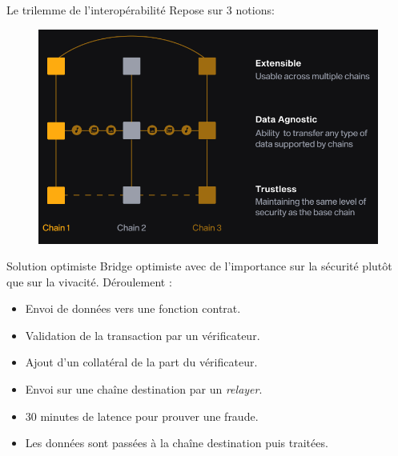 \begin{frame}{Le trilemme de l’interopérabilité}
    Repose sur 3 notions: 
    \begin{figure}
        \centering
        \includegraphics[scale = 0.7]{img/3notions.png}
    \end{figure}
    \end{frame}

\begin{frame}{Solution optimiste}
Bridge optimiste avec de l'importance sur la sécurité plutôt que sur la vivacité.
Déroulement : \newline
\begin{itemize}
    \item Envoi de données vers une fonction contrat.
    \item Validation de la transaction par un vérificateur. 
    \item Ajout d'un collatéral de la part du vérificateur. 
    \item Envoi sur une chaîne destination par un \textit{relayer}. 
    \item 30 minutes de latence pour prouver une fraude.
    \item Les données sont passées à la chaîne destination puis traitées.
\end{itemize}
\end{frame}

